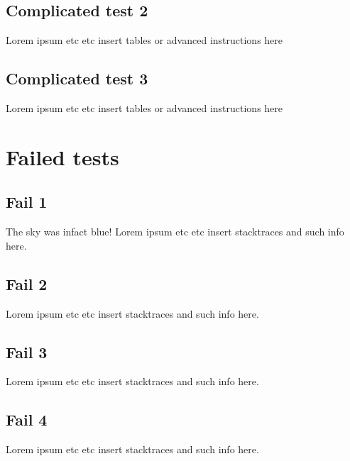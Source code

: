 \documentclass{TDP003mall}
\begin{document}
\subsection{Complicated test 2}
Lorem ipsum etc etc insert tables or advanced instructions here
\subsection{Complicated test 3}
Lorem ipsum etc etc insert tables or advanced instructions here


\section{Failed tests}\label{failed-tests}
\subsection{Fail 1}
The sky was infact blue!
Lorem ipsum etc etc insert stacktraces and such info here.
\subsection{Fail 2}
Lorem ipsum etc etc insert stacktraces and such info here.
\subsection{Fail 3}
Lorem ipsum etc etc insert stacktraces and such info here.
\subsection{Fail 4}
Lorem ipsum etc etc insert stacktraces and such info here.
\end{document}
